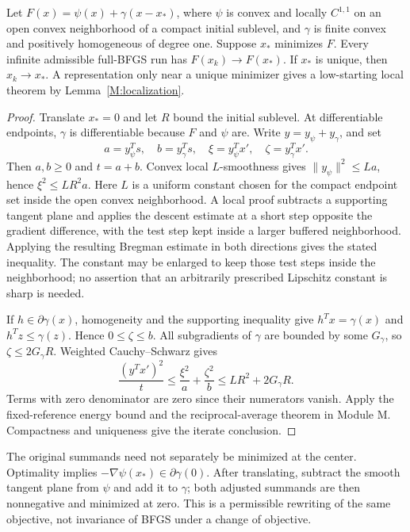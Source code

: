 \begin{theorem}\label{F:centered}
Let $F(x)=\psi(x)+\gamma(x-x_*)$, where $\psi$ is convex and locally $C^{1,1}$ on an open convex neighborhood of a compact initial sublevel, and $\gamma$ is finite convex and positively homogeneous of degree one. Suppose $x_*$ minimizes $F$. Every infinite admissible full-BFGS run has $F(x_k)\to F(x_*)$. If $x_*$ is unique, then $x_k\to x_*$. A representation only near a unique minimizer gives a low-starting local theorem by Lemma~\ref{M:localization}.
\end{theorem}
\begin{proof}
Translate $x_*=0$ and let $R$ bound the initial sublevel. At differentiable endpoints, $\gamma$ is differentiable because $F$ and $\psi$ are. Write $y=y_\psi+y_\gamma$, and set
\[
 a=y_\psi^Ts,\quad b=y_\gamma^Ts,\quad
 \xi=y_\psi^Tx',\quad\zeta=y_\gamma^Tx'.
\]
Then $a,b\ge0$ and $t=a+b$. Convex local $L$-smoothness gives $\|y_\psi\|^2\le La$, hence $\xi^2\le LR^2a$. Here $L$ is a uniform constant chosen for the compact endpoint set inside the open convex neighborhood. A local proof subtracts a supporting tangent plane and applies the descent estimate at a short step opposite the gradient difference, with the test step kept inside a larger buffered neighborhood. Applying the resulting Bregman estimate in both directions gives the stated inequality. The constant may be enlarged to keep those test steps inside the neighborhood; no assertion that an arbitrarily prescribed Lipschitz constant is sharp is needed.

If $h\in\partial\gamma(x)$, homogeneity and the supporting inequality give $h^Tx=\gamma(x)$ and $h^Tz\le\gamma(z)$. Hence $0\le\zeta\le b$. All subgradients of $\gamma$ are bounded by some $G_\gamma$, so $\zeta\le2G_\gamma R$. Weighted Cauchy--Schwarz gives
\[
 \frac{(y^Tx')^2}{t}
 \le\frac{\xi^2}{a}+\frac{\zeta^2}{b}
 \le LR^2+2G_\gamma R.
\]
Terms with zero denominator are zero since their numerators vanish. Apply the fixed-reference energy bound and the reciprocal-average theorem in Module M. Compactness and uniqueness give the iterate conclusion.
\end{proof}
The original summands need not separately be minimized at the center. Optimality implies $-\nabla\psi(x_*)\in\partial\gamma(0)$. After translating, subtract the smooth tangent plane from $\psi$ and add it to $\gamma$; both adjusted summands are then nonnegative and minimized at zero. This is a permissible rewriting of the same objective, not invariance of BFGS under a change of objective.

